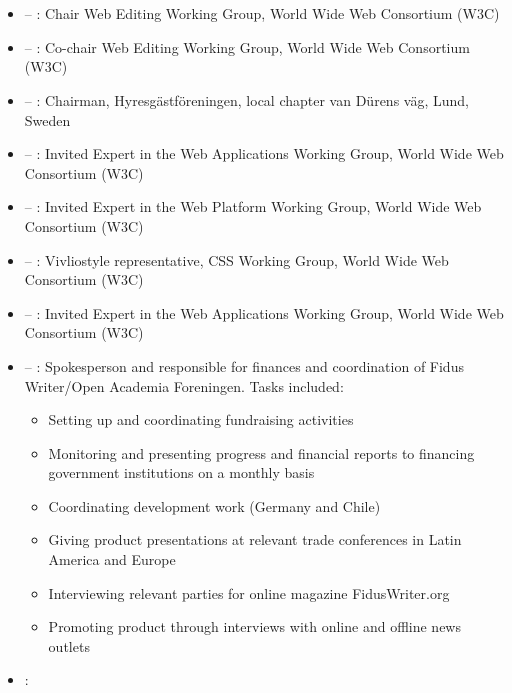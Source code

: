\section*{\organizationexperience}

\begin{itemize}

\item {} – : Chair Web Editing Working Group, World Wide Web Consortium (W3C)
\item {} – : Co-chair Web Editing Working Group, World Wide Web Consortium (W3C)
\item {} – : Chairman, Hyresgästföreningen, local chapter van Dürens väg, Lund, Sweden
\item {} – : Invited Expert in the Web Applications Working Group, World Wide Web Consortium (W3C)
\item {} – : Invited Expert in the Web Platform Working Group, World Wide Web Consortium (W3C)
\item {} – : Vivliostyle representative, CSS Working Group, World Wide Web Consortium (W3C)
\item {} –  : Invited Expert in the Web Applications Working Group, World Wide Web Consortium (W3C)
\item {} – : Spokesperson and responsible for finances and coordination of Fidus Writer/Open Academia Foreningen. Tasks included:
\begin{itemize}
\item Setting up and coordinating fundraising activities
\item Monitoring and presenting progress and financial reports to financing government institutions on a monthly basis
\item Coordinating development work (Germany and Chile)
\item Giving product presentations at relevant trade conferences in Latin America and Europe
\item Interviewing relevant parties for online magazine FidusWriter.org
\item Promoting product through interviews with online and offline news outlets
\end{itemize}
\item {}: 

\end{itemize}
